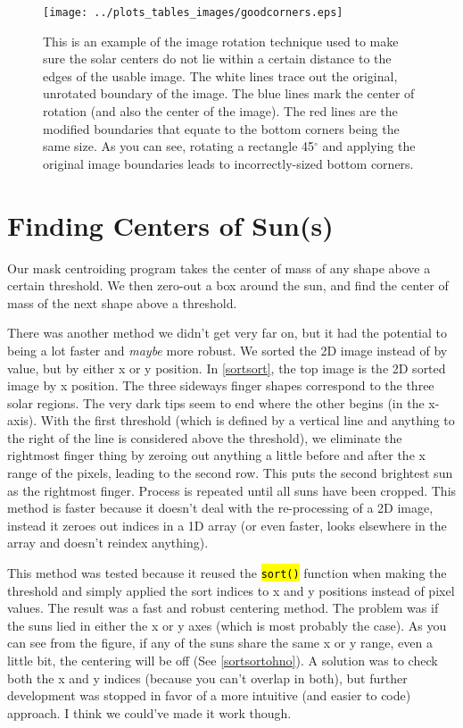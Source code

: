 \documentclass[10pt]{scrartcl}
\begin{document}
\begin{figure}[!ht]
  \texttt{[image: ../plots\_tables\_images/goodcorners.eps]}
  \caption{This is an example of the image rotation technique used to make sure the solar centers do not lie within a certain distance to the edges of the usable image. The white lines trace out the original, unrotated boundary of the image. The blue lines mark the center of rotation (and also the center of the image). The red lines are the modified boundaries that equate to the bottom corners being the same size. As you can see, rotating a rectangle 45$^\circ$ and applying the original image boundaries leads to incorrectly-sized bottom corners.}
  \label{goodcorner}
\end{figure}


\clearpage


\section{Finding Centers of Sun(s)} %
\label{sec:finding_centers_of_sun}

Our mask centroiding program takes the center of mass of any shape above a certain threshold. We then zero-out a box around the sun, and find the center of mass of the next shape above a threshold. 

There was another method we didn't get very far on, but it had the potential to being a lot faster and \emph{maybe} more robust. We sorted the 2D image instead of by value, but by either x or y position. In \cref{sortsort}, the top image is the 2D sorted image by x position. The three sideways finger shapes correspond to the three solar regions. The very dark tips seem to end where the other begins (in the x-axis). With the first threshold (which is defined by a vertical line and anything to the right of the line is considered above the threshold), we eliminate the rightmost finger thing by zeroing out anything a little before and after the x range of the pixels, leading to the second row. This puts the second brightest sun as the rightmost finger. Process is repeated until all suns have been cropped. This method is faster because it doesn't deal with the re-processing of a 2D image, instead it zeroes out indices in a 1D array (or even faster, looks elsewhere in the array and doesn't reindex anything).

This method was tested because it reused the \hl{\texttt{sort()}} function when making the threshold and simply applied the sort indices to x and y positions instead of pixel values. The result was a fast and robust centering method. The problem was if the suns lied in either the x or y axes (which is most probably the case). As you can see from the figure, if any of the suns share the same x or y range, even a little bit, the centering will be off (See \cref{sortsortohno}). A solution was to check both the x and y indices (because you can't overlap in both), but further development was stopped in favor of a more intuitive (and easier to code) approach. I think we could've made it work though.\\
\end{document}
